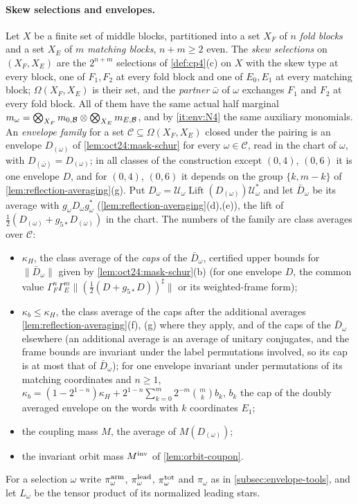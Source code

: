 \paragraph{Skew selections and envelopes.}
Let $X$ be a finite set of middle blocks, partitioned into a set $X_F$ of $n$
\emph{fold blocks} and a set $X_E$ of $m$ \emph{matching blocks}, $n+m\ge2$ even.
The \emph{skew selections} on $(X_F,X_E)$ are the $2^{n+m}$ selections of
\cref{def:cp4}(c) on $X$ with the skew type at every block, one of $F_1,F_2$ at
every fold block and one of $E_0,E_1$ at every matching block; $\Omega(X_F,X_E)$
is their set, and the \emph{partner} $\bar\omega$ of $\omega$ exchanges $F_1$ and
$F_2$ at every fold block. All of them have the same actual half marginal
$m_\omega=\bigotimes_{X_F}m_{0,\mathcal B}\otimes\bigotimes_{X_E}m_{E,\mathcal B}$, and by \ref{it:env:N4}
the same auxiliary monomials. An \emph{envelope family} for a set
$\mathcal C\subseteq\Omega(X_F,X_E)$ closed under the pairing is an envelope $D_{(\omega)}$
of \cref{lem:oct24:mask-schur} for every $\omega\in\mathcal C$, read in the chart of $\omega$,
with $D_{(\bar\omega)}=D_{(\omega)}$; in all classes of the construction except
$(0,4)$, $(0,6)$ it is one envelope $D$, and for $(0,4)$, $(0,6)$ it depends on the
group $\{k,m-k\}$ of \cref{lem:reflection-averaging}(g). Put
$D_\omega=\mathcal U_\omega\operatorname{Lift}(D_{(\omega)})\mathcal U_\omega^*$ and let $\bar D_\omega$ be its
average with $g_\omega D_\omega g_\omega^*$ (\cref{lem:reflection-averaging}(d),(e)), the
lift of $\frac12(D_{(\omega)}+g_{5*}D_{(\omega)})$ in the chart. The numbers of the family
are class averages over $\mathcal C$:
\begin{itemize}
\item $\kappa_H$, the class average of the \emph{caps} of the $\bar D_\omega$, certified upper
 bounds for $\|\bar D_\omega\|$ given by \cref{lem:oct24:mask-schur}(b) (for one envelope
 $D$, the common value $\Gamma_F^n\Gamma_E^m\|(\frac12(D+g_{5*}D))^\sharp\|$ or its
 weighted-frame form);
\item $\kappa_b\le\kappa_H$, the class average of the caps after the additional averages
 \cref{lem:reflection-averaging}(f), (g) where they apply, and of the caps of the
 $\bar D_\omega$ elsewhere (an additional average is an average of unitary conjugates, and the
 frame bounds are invariant under the label permutations involved, so its cap is at
 most that of $\bar D_\omega$); for one envelope invariant under permutations of its
 matching coordinates and $n\ge1$,
 $\kappa_b=(1-2^{1-n})\kappa_H+2^{1-n}\sum_{k=0}^m2^{-m}\binom mkb_k$, $b_k$ the cap of the
 doubly averaged envelope on the words with $k$ coordinates $E_1$;
\item the coupling mass $M$, the average of $M(D_{(\omega)})$;
\item the invariant orbit mass $M^{\rm inv}$ of \cref{lem:orbit-coupon}.
\end{itemize}
For a selection $\omega$ write $\pi^{\rm arm}_\omega$, $\pi^{\rm lead}_\omega$,
$\pi^{\rm tot}_\omega$ and $\pi_\omega$ as in \cref{subsec:envelope-tools}, and let $L_\omega$ be
the tensor product of its normalized leading stars.

